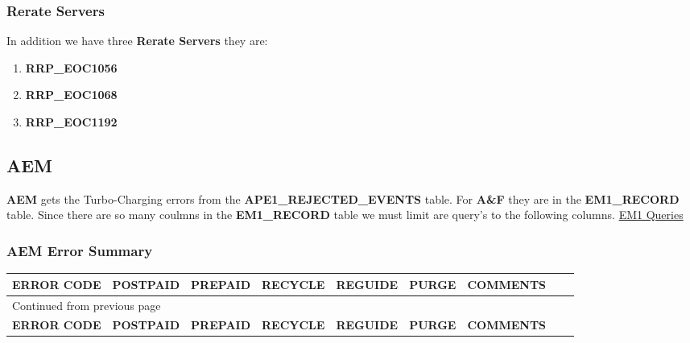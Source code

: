 \documentclass[12pt,twoside]{article}
\begin{document}
\subsubsection{Rerate Servers}
\label{sec:orgheadline4}
In addition we have three \textbf{Rerate Servers} they are:
\begin{enumerate}
\item \textbf{RRP\_EOC1056}
\item \textbf{RRP\_EOC1068}
\item \textbf{RRP\_EOC1192}
\end{enumerate}
\newpage 
\begin{landscape}  
\subsection{AEM}
\label{sec:orgheadline7}
\textbf{AEM} gets the Turbo-Charging errors from the
\textbf{APE1\_REJECTED\_EVENTS} table. For \textbf{A\&F} they are in the
\textbf{EM1\_RECORD} table. Since there are so many coulmns in the
\textbf{EM1\_RECORD} table we must limit are query's to the following
columns. \href{docs/EM1\%20Query's}{EM1 Queries}

\subsubsection{AEM Error Summary}
\label{sec:orgheadline6}
\scriptsize
\begin{longtable}{l|l|l|l|l|l|l|l|l}
\hline
\textbf{ERROR CODE} & \textbf{POSTPAID} & \textbf{PREPAID} & \textbf{RECYCLE} & \textbf{REGUIDE} & \textbf{PURGE} & \textbf{COMMENTS}\\
\hline
\endfirsthead
\multicolumn{7}{l}{Continued from previous page} \\
\hline

\textbf{ERROR CODE} & \textbf{POSTPAID} & \textbf{PREPAID} & \textbf{RECYCLE} & \textbf{REGUIDE} & \textbf{PURGE} & \textbf{COMMENTS} \\


\end{longtable}
\end{landscape}
\end{document}

